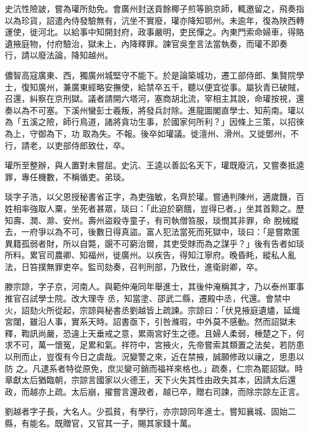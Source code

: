 \begin{pinyinscope}
 史沆性險詖，嘗為瓘所劾免。會廣州封送貢餘椰子煎等餉京師，輒邀留之，飛奏指以為珍貨，詔遣內侍發驗無有，沆坐不實廢，瓘亦降知鄂州。未逾年，復為陜西轉運使，徙河北。以給事中知開封府，政事嚴明，吏民憚之。內東門索命婦車，得賂遺掖庭物，付府驗治，獄未上，內降釋罪。諫官吳奎言法當執奏，而瓘不即奏
 行，請以廢法論，降知越州。



 儂智高寇廣東、西，獨廣州城堅守不能下。於是論築城功，遷工部侍郎、集賢院學士，復知廣州，兼廣東經略安撫使，給禁卒五千，聽以便宜從事。屬狄青已破賊，召還，糾察在京刑獄。議者請開六塔河，塞商胡北流，宰相主其說，命瓘按視，還奏以為不可塞。下溪州蠻彭士羲叛，將發兵討除。進龍圖閣直學士、知荊南。瓘以為「五溪之險，師行鳥道，諸將貪功生事，於國家何所利？」因條上三策，以招徠為上，守御為下，功
 取為失。不報。後卒如瓘議。徙澶州、滑州。又徙鄧州，不行，請老，以吏部侍郎致仕，卒。



 瓘所至整辦，與人置對未嘗屈。史沆、王逵以善訟名天下，瓘既廢沆，又嘗奏抵逵罪，專任機數，不稱循吏。弟琰。



 琰字子浩，以父恩授秘書省正字，為吏強敏，名齊於瓘。嘗通判陳州，適歲饑，百姓相率強取人粟，坐死者甚眾，琰曰：「此迫於窮餓，豈得已者。」坐其首黥之。歷知壽、潤、滁、安州。壽州盜殺寺童子，有司執僧笞服，琰憫其非罪，命
 脫械縱去，一府爭以為不可，後數日得真盜。富人犯法當死而死獄中，琰曰：「是嘗欺匿異籍孤弱者財，所以自斃，覬不可窮治爾，其吏受賕而為之謀乎？」後有告者如琰所料。累官司農卿、知福州，徙廣州。以疾告，得知江寧府。晚昏眊，縱私人亂法，日笞撲無罪吏卒。監司劾奏，召判刑部，乃致仕，進衛尉卿，卒。



 滕宗諒，字子京，河南人。與範仲淹同年舉進士，其後仲淹稱其才，乃以泰州軍事推官召試學士院。改大理寺
 丞，知當塗、邵武二縣，遷殿中丞，代還。會禁中火，詔劾火所從起，宗諒與秘書丞劉越皆上疏諫。宗諒曰：「伏見掖庭遺燼，延熾宮闥，雖沿人事，實系天時。詔書亟下，引咎滌瑕，中外莫不感動。然而詔獄未釋，鞫訊尚嚴，恐違上天垂戒之意，累兩宮好生之德。且婦人柔弱，棰楚之下，何求不可，萬一懷冤，足累和氣。祥符中，宮掖火，先帝嘗索其類置之法矣，若防患以刑而止，豈復有今日之虞哉。況變警之來，近在禁掖，誠願修政以禳之，思患以防
 之。凡逮系者特從原免，庶災變可銷而福祥來格也。」疏奏，仁宗為罷詔獄。時章獻太后猶臨朝，宗諒言國家以火德王，天下火失其性由政失其本，因請太后還政，而越亦上疏。太后崩，擢嘗言還政者，越已卒，贈右司諫，而除宗諒左正言。



 劉越者字子長，大名人。少孤貧，有學行，亦宗諒同年進士。嘗知襄城、固始二縣，有能名。既贈官，又官其一子，賜其家錢十萬。




\end{pinyinscope}
